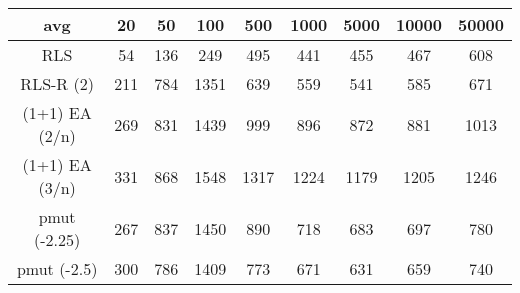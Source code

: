 \begin{tabular}[h]{ccccccccc}
avg&20&50&100&500&1000&5000&10000&50000\\\hline
RLS&54&136&249&495&441&455&467&608\\
RLS-R (2)&211&784&1351&639&559&541&585&671\\
(1+1) EA (2/n)&269&831&1439&999&896&872&881&1013\\
(1+1) EA (3/n)&331&868&1548&1317&1224&1179&1205&1246\\
pmut (-2.25)&267&837&1450&890&718&683&697&780\\
pmut (-2.5)&300&786&1409&773&671&631&659&740\\
\end{tabular}
